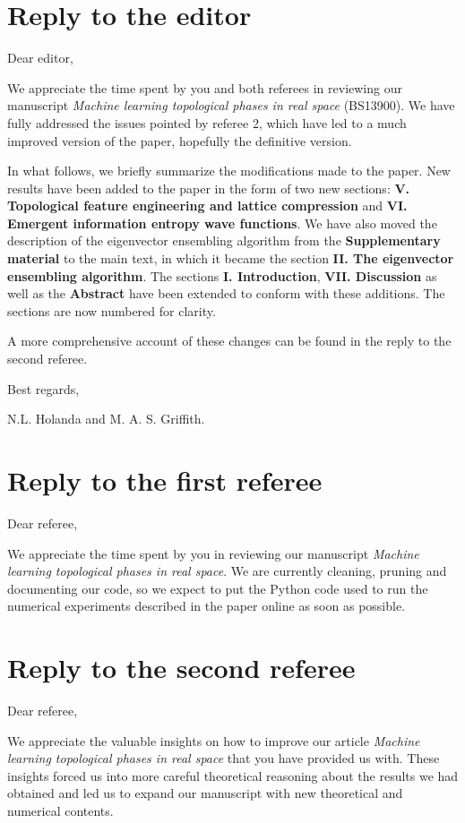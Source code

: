 \documentclass[10pt]{revtex4-1}
\begin{document}
\section*{Reply to the editor}

Dear editor,

We appreciate the time spent by you and both referees in reviewing our manuscript \emph{Machine learning topological phases in real space} (BS13900). We have fully addressed the issues pointed by referee 2, which have led to a much improved version of the paper, hopefully the definitive version.   

In what follows, we briefly summarize the modifications made to the paper. New results have been added to the paper in the form of two new sections: \textbf{V. Topological feature engineering and lattice compression} and \textbf{VI. Emergent information entropy wave functions}. We have also moved the description of the eigenvector ensembling algorithm from the \textbf{Supplementary material} to the main text, in which it became the section \textbf{II. The eigenvector ensembling algorithm}. The sections \textbf{I. Introduction}, \textbf{VII. Discussion} as well as the \textbf{Abstract} have been extended to conform with these additions. The sections are now numbered for clarity.

A more comprehensive account of these changes can be found in the reply to the second referee.  

Best regards,

N.L. Holanda and M. A. S. Griffith.

\section*{Reply to the first referee}
Dear referee, 

We appreciate the time spent by you in reviewing our manuscript \emph{Machine learning topological phases in real space}. We are currently cleaning, pruning and documenting our code, so we expect to put the Python code used to run the numerical experiments described in the paper online as soon as possible.    

\section*{Reply to the second referee}
Dear referee,

We appreciate the valuable insights on how to improve our article \emph{Machine learning topological phases in real space} that you have provided us with. These insights forced us into more careful theoretical reasoning about the results we had obtained and led us to expand our manuscript with new theoretical and numerical contents. 
\end{document}
